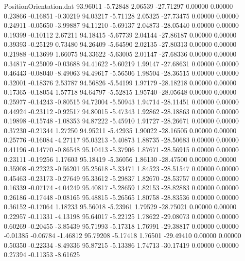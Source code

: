 \begin{filecontents}{PositionOrientation.dat}
  93.96011   -5.72848    2.06539   -27.71297    0.00000    0.00000    0.23866   -0.16851   -0.30219
  94.03217   -5.71128    2.05325   -27.73475    0.00000    0.00000    0.24911   -0.05650   -3.99887
  94.11210   -5.69137    2.04873   -28.05440    0.00000    0.00000    0.19399   -0.10112    2.67211
  94.18415   -5.67739    2.04144   -27.86187    0.00000    0.00000    0.39393   -0.25129    0.73480
  94.26409   -5.64590    2.02135   -27.80313    0.00000    0.00000    0.21988   -0.13699    1.66075
  94.33622   -5.63005    2.01147   -27.68336    0.00000    0.00000    0.34817   -0.25009   -0.03688
  94.41622   -5.60219    1.99147   -27.68631    0.00000    0.00000    0.46443   -0.08040   -8.49063
  94.49617   -5.56506    1.98504   -28.36515    0.00000    0.00000    0.32001   -0.18376    2.53787
  94.56826   -5.54199    1.97179   -28.18218    0.00000    0.00000    0.17365   -0.18054    1.57718
  94.64797   -5.52815    1.95740   -28.05648    0.00000    0.00000    0.25977   -0.14243   -0.80515
  94.72004   -5.50943    1.94714   -28.11451    0.00000    0.00000    0.44924   -0.23112   -0.92517
  94.80015   -5.47343    1.92862   -28.18863    0.00000    0.00000    0.19898   -0.15748   -1.08353
  94.87222   -5.45910    1.91727   -28.26671    0.00000    0.00000    0.37230   -0.21344    1.27250
  94.95211   -5.42935    1.90022   -28.16505    0.00000    0.00000    0.25776   -0.16084   -4.27117
  95.03213   -5.40873    1.88735   -28.50683    0.00000    0.00000    0.41196   -0.14770   -0.86548
  95.10413   -5.37906    1.87671   -28.56915    0.00000    0.00000    0.23111   -0.19256    1.17603
  95.18419   -5.36056    1.86130   -28.47500    0.00000    0.00000    0.35908   -0.22323   -0.56201
  95.25618   -5.33471    1.84523   -28.51547    0.00000    0.00000    0.45463   -0.23173   -0.27649
  95.33612   -5.29837    1.82670   -28.53757    0.00000    0.00000    0.16339   -0.07174   -4.04249
  95.40817   -5.28659    1.82153   -28.82883    0.00000    0.00000    0.26186   -0.17448   -0.08165
  95.48815   -5.26565    1.80758   -28.83536    0.00000    0.00000    0.36152   -0.17064    1.18233
  95.56018   -5.23961    1.79529   -28.75021    0.00000    0.00000    0.22957   -0.11331   -4.13198
  95.64017   -5.22125    1.78622   -29.08073    0.00000    0.00000    0.60269   -0.20455   -3.85439
  95.71993   -5.17318    1.76991   -29.38817    0.00000    0.00000   -0.01385   -0.06784   -1.46812
  95.79208   -5.17418    1.76501   -29.49410    0.00000    0.00000    0.50350   -0.22334   -8.49336
  95.87215   -5.13386    1.74713   -30.17419    0.00000    0.00000    0.27394   -0.11353   -8.61625

\end{filecontents}
